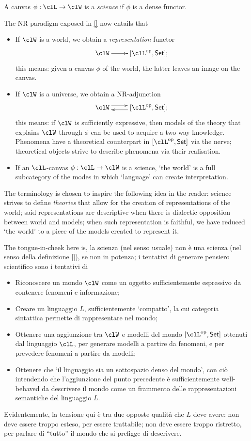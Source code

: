 \documentclass[a4paper]{../birkjour}
\begin{document}
A canvas $\phi : \clL \to \clW$ is a \emph{science} if $\phi$ is a dense functor.
\begin{remark}
  The NR paradigm exposed in \autoref{} now entails that 
  \begin{itemize}
    \item If $\clW$ is a world, we obtain a \emph{representation} functor 
    \[ \xymatrix{\clW \ar[r] & [\clL^\op, \Set];} \]
    this means: given a canvas $\phi$ of the world, the latter leaves an image on the canvas.
    \item If $\clW$ is a universe, we obtain a NR-adjunction
    \[\xymatrix{\clW \ar@<3pt>[r] & \ar@<3pt>[l] [\clL^\op, \Set];}\]
    this means: if $\clW$ is sufficiently expressive, then models of the theory that explains $\clW$ through $\phi$ can be used to acquire a two-way knowledge. Phenomena have a theoretical counterpart in $[\clL^\op,\Set]$ via the nerve; theoretical objects strive to describe phenomena via their realisation.
    \item If an $\clL$-canvas $\phi : \clL \to \clW$ is a science, `the world' is a full subcategory of the modes in which `language' can create interpretation.
  \end{itemize}
\end{remark}
The terminology is chosen to inspire the following idea in the reader: science strives to define \emph{theories} that allow for the creation of representations of the world; said representations are descriptive when there is dialectic opposition between world and models; when such representation is faithful, we have reduced `the world' to a piece of the models created to represent it.

The tongue-in-cheek here is, la scienza (nel senso usuale) non è una scienza (nel senso della definizione \autoref{}), se non in potenza; i tentativi di generare pensiero scientifico sono i tentativi di 
\begin{itemize}
  \item Riconoscere un mondo $\clW$ come un oggetto sufficientemente espressivo da contenere fenomeni e informazione;
  \item Creare un linguaggio $L$, sufficientemente `compatto', la cui categoria sintattica permette di rappresentare nel mondo;
  \item Ottenere una aggiunzione tra $\clW$ e modelli del mondo $[\clL^\op,\Set]$ ottenuti dal linguaggio $\clL$, per generare modelli a partire da fenomeni, e per prevedere fenomeni a partire da modelli;
  \item Ottenere che `il linguaggio sia un sottospazio denso del mondo', con ciò intendendo che l'aggiunzione del punto precedente è sufficientemente well-behaved da descrivere il mondo come un frammento delle rappresentazioni semantiche del linguaggio $L$.
\end{itemize}
Evidentemente, la tensione qui è tra due opposte qualità che $L$ deve avere: non deve essere troppo esteso, per essere trattabile; non deve essere troppo ristretto, per parlare di ``tutto'' il mondo che si prefigge di descrivere.
\end{document}

